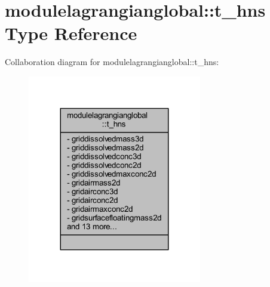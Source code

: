\hypertarget{structmodulelagrangianglobal_1_1t__hns}{}\section{modulelagrangianglobal\+:\+:t\+\_\+hns Type Reference}
\label{structmodulelagrangianglobal_1_1t__hns}


Collaboration diagram for modulelagrangianglobal\+:\+:t\+\_\+hns\+:\nopagebreak
\begin{figure}[H]
\begin{center}
\leavevmode
\includegraphics[width=215pt]{structmodulelagrangianglobal_1_1t__hns__coll__graph}
\end{center}
\end{figure}
